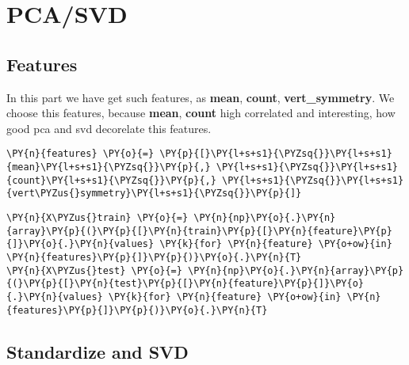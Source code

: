 \section*{PCA/SVD}\label{pcasvd}

\subsection*{Features}

In this part we have get such features, as \textbf{mean}, \textbf{count}, \textbf{vert\_symmetry}.
We choose this features, because  \textbf{mean}, \textbf{count} high correlated and interesting, how good pca and svd decorelate this features.
        
    \begin{tcolorbox}[breakable, size=fbox, boxrule=1pt, pad at break*=1mm,colback=cellbackground, colframe=cellborder]
\begin{Verbatim}[commandchars=\\\{\}]
\PY{n}{features} \PY{o}{=} \PY{p}{[}\PY{l+s+s1}{\PYZsq{}}\PY{l+s+s1}{mean}\PY{l+s+s1}{\PYZsq{}}\PY{p}{,} \PY{l+s+s1}{\PYZsq{}}\PY{l+s+s1}{count}\PY{l+s+s1}{\PYZsq{}}\PY{p}{,} \PY{l+s+s1}{\PYZsq{}}\PY{l+s+s1}{vert\PYZus{}symmetry}\PY{l+s+s1}{\PYZsq{}}\PY{p}{]}
\end{Verbatim}
\end{tcolorbox}

    \begin{tcolorbox}[breakable, size=fbox, boxrule=1pt, pad at break*=1mm,colback=cellbackground, colframe=cellborder]
\begin{Verbatim}[commandchars=\\\{\}]
\PY{n}{X\PYZus{}train} \PY{o}{=} \PY{n}{np}\PY{o}{.}\PY{n}{array}\PY{p}{(}\PY{p}{[}\PY{n}{train}\PY{p}{[}\PY{n}{feature}\PY{p}{]}\PY{o}{.}\PY{n}{values} \PY{k}{for} \PY{n}{feature} \PY{o+ow}{in} \PY{n}{features}\PY{p}{]}\PY{p}{)}\PY{o}{.}\PY{n}{T}
\PY{n}{X\PYZus{}test} \PY{o}{=} \PY{n}{np}\PY{o}{.}\PY{n}{array}\PY{p}{(}\PY{p}{[}\PY{n}{test}\PY{p}{[}\PY{n}{feature}\PY{p}{]}\PY{o}{.}\PY{n}{values} \PY{k}{for} \PY{n}{feature} \PY{o+ow}{in} \PY{n}{features}\PY{p}{]}\PY{p}{)}\PY{o}{.}\PY{n}{T}
\end{Verbatim}
\end{tcolorbox}

\subsection*{Standardize and SVD}

